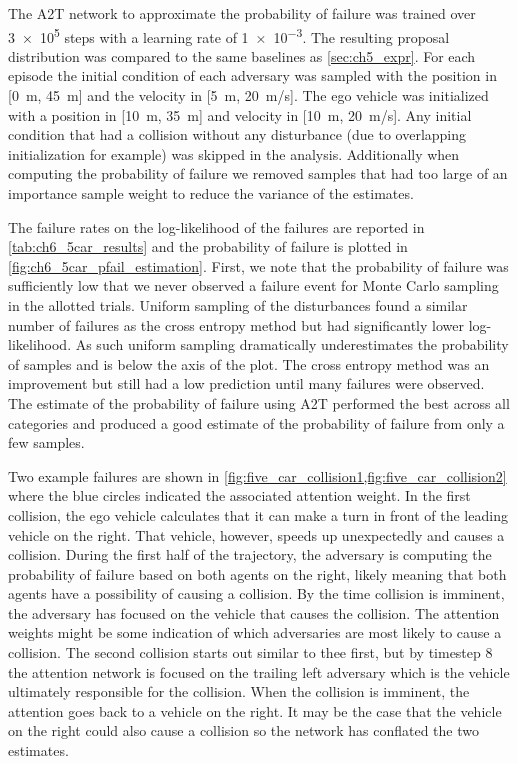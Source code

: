 The A2T network to approximate the probability of failure was trained over \num{3e5} steps with a learning rate of \num{1e-3}. The resulting proposal distribution was compared to the same baselines as \cref{sec:ch5_expr}. For each episode the initial condition of each adversary was sampled with the position in [\SI{0}{m}, \SI{45}{m}] and the velocity in  [\SI{5}{m}, \SI{20}{m/s}]. The ego vehicle was initialized with a position in [\SI{10}{m}, \SI{35}{m}] and velocity in [\SI{10}{m}, \SI{20}{m/s}]. Any initial condition that had a collision without any disturbance (due to overlapping initialization for example) was skipped in the analysis. Additionally when computing the probability of failure we removed samples that had too large of an importance sample weight to reduce the variance of the estimates. 

The failure rates on the log-likelihood of the failures are reported in \cref{tab:ch6_5car_results} and the probability of failure is plotted in \cref{fig:ch6_5car_pfail_estimation}. First, we note that the probability of failure was sufficiently low that we never observed a failure event for Monte Carlo sampling in the allotted trials. Uniform sampling of the disturbances found a similar number of failures as the cross entropy method but had significantly lower log-likelihood. As such uniform sampling dramatically underestimates the probability of samples and is below the axis of the plot. The cross entropy method was an improvement but still had a low prediction until many failures were observed. The estimate of the probability of failure using A2T performed the best across all categories and produced a good estimate of the probability of failure from only a few samples.

Two example failures are shown in \cref{fig:five_car_collision1,fig:five_car_collision2} where the blue circles indicated the associated attention weight. In the first collision, the ego vehicle calculates that it can make a turn in front of the leading vehicle on the right. That vehicle, however, speeds up unexpectedly and causes a collision. During the first half of the trajectory, the adversary is computing the probability of failure based on both agents on the right, likely meaning that both agents have a possibility of causing a collision. By the time collision is imminent, the adversary has focused on the vehicle that causes the collision. The attention weights might be some indication of which adversaries are most likely to cause a collision. The second collision starts out similar to thee first, but by timestep \num{8} the attention network is focused on the trailing left adversary which is the vehicle ultimately responsible for the collision. When the collision is imminent, the attention goes back to a vehicle on the right. It may be the case that the vehicle on the right could also cause a collision so the network has conflated the two estimates. 

